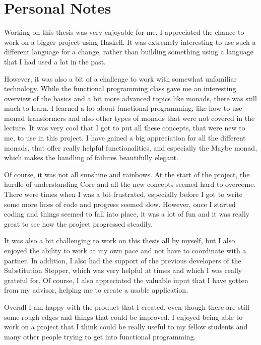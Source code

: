\chapter{Personal Notes}
Working on this thesis was very enjoyable for me.
I appreciated the chance to work on a bigger project using Haskell.
It was extremely interesting to use such a different language for a change,
rather than building something using a language that I had used a lot in the past.

However,
it was also a bit of a challenge to work with somewhat unfamiliar technology.
While the functional programming class gave me an interesting overview of the basics and a bit more advanced topics like monads,
there was still much to learn.
I learned a lot about functional programming,
like how to use monad transformers and also other types of monads that were not covered in the lecture.
It was very cool that I got to put all these concepts, that were new to me, to use in this project.
I have gained a big appreciation for all the different monads,
that offer really helpful functionalities,
and especially the Maybe monad,
which makes the handling of failures beautifully elegant.

Of course,
it was not all sunshine and rainbows.
At the start of the project,
the hurdle of understanding Core and all the new concepts seemed hard to overcome.
There were times when I was a bit frustrated,
especially before I got to write some more lines of code and progress seemed slow.
However, once I started coding and things seemed to fall into place,
it was a lot of fun and it was really great to see how the project progressed steadily.

It was also a bit challenging to work on this thesis all by myself,
but I also enjoyed the ability to work at my own pace and not have to coordinate with a partner.
In addition, I also had the support of the previous developers of the Substitution Stepper,
which was very helpful at times and which I was really grateful for.
Of course, I also appreciated the valuable input that I have gotten from my advisor,
helping me to create a usable application.

Overall I am happy with the product that I created,
even though there are still some rough edges and things that could be improved.
I enjoyed being able to work on a project that I think could be really useful to my fellow students
and many other people trying to get into functional programming.
